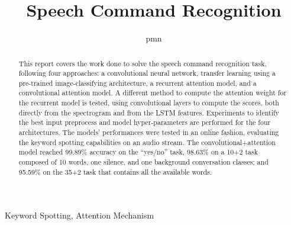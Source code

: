 \documentclass[10pt, conference, letterpaper]{IEEEtran}
\title{Speech Command Recognition}
\author{pmn}
\begin{document}
\maketitle

\begin{abstract} This report covers the work done to solve the speech command
    recognition task, following four approaches: a convolutional neural
    network, transfer learning using a pre-trained image-classifying
    architecture, a recurrent attention model, and a convolutional attention
    model.
    A different method to compute the attention weight for the recurrent model
    is tested, using convolutional layers to compute the scores, both directly
    from the spectrogram and from the LSTM features.
    Experiments to identify the best input preprocess and model
    hyper-parameters are performed for the four architectures.
    The models' performances were tested in an online fashion, evaluating the
    keyword spotting capabilities on an audio stream.
    The convolutional+attention model reached 99.89\% accuracy on the ``yes/no''
    task, 98.63\% on a 10+2 task composed of 10 words, one silence, and one
    background conversation classes; and 95.59\% on the 35+2 task that contains
    all the available words.
\end{abstract}

\IEEEkeywords
Keyword Spotting,
Attention Mechanism
\endIEEEkeywords















\end{document}
